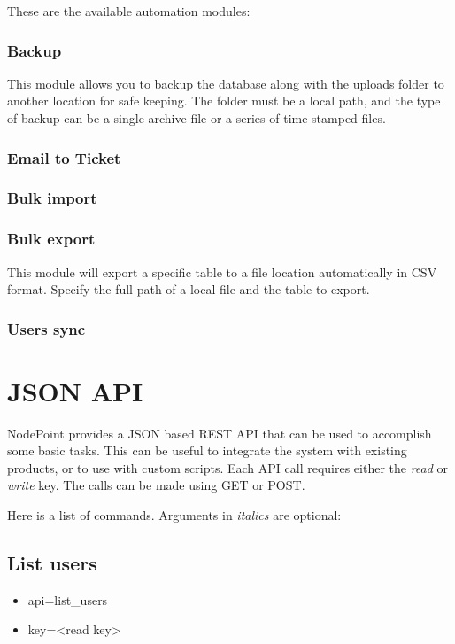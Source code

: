 \documentclass[11pt]{article}
\begin{document}
These are the available automation modules:

\subsubsection{Backup}

This module allows you to backup the database along with the uploads folder to another location for safe keeping. The folder must be a local path, and the type of backup can be a single archive file or a series of time stamped files.

\subsubsection{Email to Ticket}

\subsubsection{Bulk import}

\subsubsection{Bulk export}

This module will export a specific table to a file location automatically in CSV format. Specify the full path of a local file and the table to export.

\subsubsection{Users sync}

\clearpage
\section{JSON API}
NodePoint provides a JSON based REST API that can be used to accomplish some basic tasks. This can be useful to integrate the system with existing products, or to use with custom scripts. Each API call requires either the \textit{read} or \textit{write} key. The calls can be made using GET or POST.

Here is a list of commands. Arguments in \textit{italics} are optional:

\subsection{List users}

\begin{itemize}
\item api=list\_users
\item key=<read key>
\end{itemize}
\end{document}
